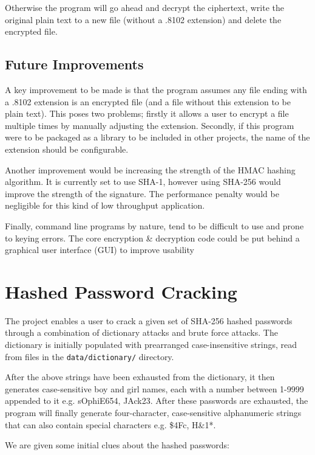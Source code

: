 \documentclass[journal,comsoc]{IEEEtran}
\begin{document}
	Otherwise the program will go ahead and decrypt the ciphertext, write the original plain text to a new file (without a .8102 extension) and delete the encrypted file.

	\subsection{Future Improvements}
	
	A key improvement to be made is that the program assumes any file ending with a .8102 extension is an encrypted file (and a file without this extension to be plain text). This poses two problems; firstly it allows a user to encrypt a file multiple times by manually adjusting the extension. Secondly, if this program  were to be packaged as a library to be included in other projects, the name of the extension should be configurable.
	
	Another improvement would be increasing the strength of the HMAC hashing algorithm. It is currently set to use SHA-1, however using SHA-256 would improve the strength of the signature. The performance penalty would be negligible for this kind of low throughput application.
	
	Finally, command line programs by nature, tend to be difficult to use and prone to keying errors. The core encryption \& decryption code could be put behind a graphical user interface (GUI) to improve usability
	
	\section{Hashed Password Cracking}\label{sec:hashcracking}
	
	The project enables a user to crack a given set of SHA-256 hashed passwords through a combination of dictionary attacks and brute force attacks. The dictionary is initially populated with prearranged case-insensitive strings, read from files in the \texttt{data/dictionary/} directory. 
	
	After the above strings have been exhausted from the dictionary, it then generates case-sensitive boy and girl names, each with a number between 1-9999 appended to it e.g. sOphiE654, JAck23. After these passwords are exhausted, the program will finally generate four-character, case-sensitive alphanumeric strings that can also contain special characters e.g. \$4Fc, H\&1*. 
	
	We are given some initial clues about the hashed passwords:
	
\end{document}
